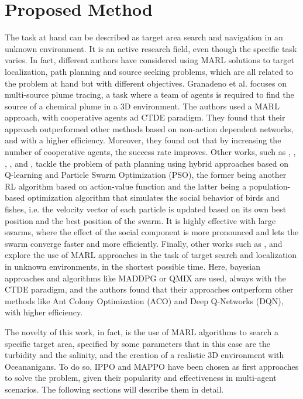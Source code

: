 \chapter{Proposed Method}

The task at hand can be described as target area search and navigation in an unknown environment. 
It is an active research field, even though the specific task varies. In fact, different authors have considered using MARL solutions
to target localization, path planning and source seeking problems, which are all related to the problem at hand 
but with different objectives. Granadeno et al. \cite{granadeno2025multisource} focuses on multi-source plume tracing,
a task where a team of agents is required to find the source of a chemical plume in a 3D environment. The authors 
used a MARL approach, with cooperative agents ad CTDE paradigm. They found that their approach
outperformed other methods based on non-action dependent networks, and with a higher efficiency. Moreover,
they found out that by increasing the number of cooperative agents, the success rate improves. 
Other works, such as \cite{tan2024adaptiveqpso}, \cite{ma2024improvedqpso}, \cite{saeed2024energyefficient}, \cite{meerza2019qpso}, \cite{li2022qualityoriented} and \cite{li2025qlmopso}, 
tackle the problem of path planning using hybrid approaches based on Q-learning and Particle Swarm Optimization (PSO), the former being another RL algorithm 
based on action-value function and the latter being a population-based optimization algorithm that simulates the social behavior of birds and fishes, i.e.
the velocity vector of each particle is updated based on its own best position and the best position of the swarm. It is highly effective with large swarms,
where the effect of the social component is more pronounced and lets the swarm converge faster and more efficiently.
Finally, other works such as \cite{li2024multiauvsearch}, \cite{li2025multiauvmoving} and \cite{hou2024uavswarmsearch} explore the use of MARL 
approaches in the task of target search and localization in unknown environments, in the shortest possible time. Here, bayesian approaches and algorithms like MADDPG or QMIX are
used, always with the CTDE paradigm, and the authors found that their approaches outperform other methods like Ant Colony Optimization (ACO) and Deep Q-Networks (DQN), with higher efficiency.

The novelty of this work, in fact,
is the use of MARL algorithms to search a specific target area, specified by some parameters that in 
this case are the turbidity and the salinity, and the creation of a realistic 3D environment with Oceananigans. To do so, IPPO \cite{dewitt2020ippo} and MAPPO \cite{yu2022mappo} have been 
chosen as first approaches to solve the problem, given their popularity and effectiveness in multi-agent scenarios. The following sections will describe 
them in detail. 

